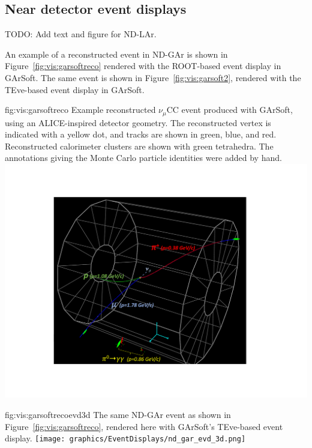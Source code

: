 \documentclass[../main-v1.tex]{subfiles}
\begin{document}
\subsection{Near detector event displays}
\label{sec:visualization:neardetector}

TODO:  {\color{red}Add text and figure for ND-LAr.}

An example of a reconstructed event in ND-GAr is shown in Figure~\ref{fig:vis:garsoftreco} rendered with the ROOT-based event display in GArSoft.  The same event is shown in Figure~\ref{fig:vis:garsoft2}, rendered with the TEve-based event display in GArSoft.

\begin{dunefigure}
{fig:vis:garsoftreco} 
{Example reconstructed $\nu_\mu$CC event produced with GArSoft, using an ALICE-inspired detector geometry.  The reconstructed vertex is indicated with a yellow dot, and tracks are shown in green, blue, and red.  Reconstructed calorimeter clusters are shown with green tetrahedra.  The annotations giving the Monte Carlo particle identities were added by hand.}
\includegraphics[width=0.9 \textwidth]{graphics/EventDisplays/nd_gar_evdwp2_withcaloclusters.pdf}
\end{dunefigure}

\begin{dunefigure}
{fig:vis:garsoftrecoevd3d} 
{The same ND-GAr event as shown in Figure~\ref{fig:vis:garsoftreco}, rendered here with GArSoft's TEve-based event display.}
\texttt{[image: graphics/EventDisplays/nd\_gar\_evd\_3d.png]}
\end{dunefigure}
\end{document}
